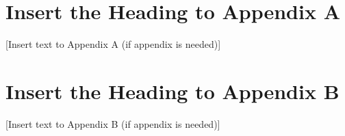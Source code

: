 \documentclass[12pt]{uthesis-v12}  %
\begin{document}
\appendix

\chapter{Insert the Heading to Appendix A}

[Insert text to Appendix A (if appendix is needed)]


\chapter{Insert the Heading to Appendix B}

[Insert text to Appendix B (if appendix is needed)]


\end{document}
